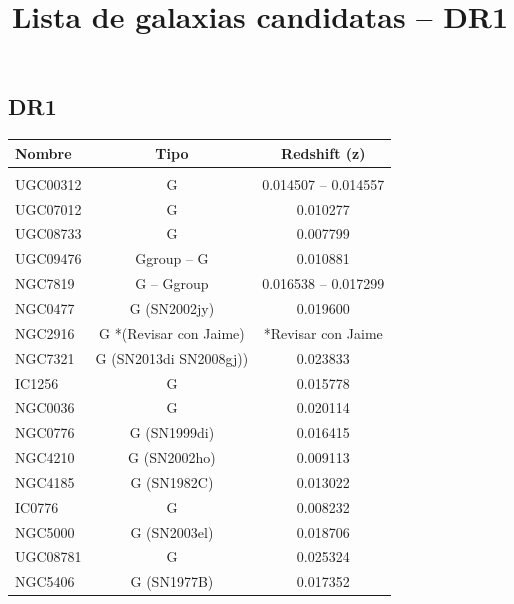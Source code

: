 \documentclass[9pt]{revtex4-1}
\title{Lista de galaxias candidatas -- DR1}
\begin{document}
\maketitle

\begin{@twocolumnfalse}
\section{DR1}

\begin{center}
\begin{tabular}{ l c c }
Nombre & Tipo & Redshift (z) \\
\hline
\hline \\
UGC00312 & G & 0.014507 -- 0.014557 \\
UGC07012 & G & 0.010277 \\
UGC08733 & G & 0.007799 \\
UGC09476 & Ggroup -- G & 0.010881 \\
NGC7819 & G -- Ggroup & 0.016538 -- 0.017299 \\
NGC0477 & G (SN2002jy) & 0.019600 \\
NGC2916 & G *(Revisar con Jaime) & *Revisar con Jaime \\
NGC7321 & G (SN2013di SN2008gj)) & 0.023833 \\
IC1256  & G & 0.015778 \\
NGC0036 & G & 0.020114 \\
NGC0776 & G (SN1999di) & 0.016415 \\
NGC4210 & G (SN2002ho) & 0.009113 \\
NGC4185 & G (SN1982C)  & 0.013022 \\
IC0776  & G & 0.008232 \\
NGC5000 & G (SN2003el) & 0.018706 \\
UGC08781 & G & 0.025324 \\
NGC5406 & G (SN1977B) & 0.017352
\end{tabular}
\end{center}

\end{@twocolumnfalse}



\end{document}
